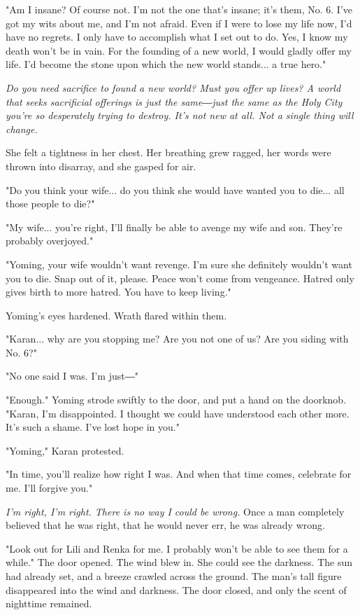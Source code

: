 "Am I insane? Of course not. I'm not the one that's insane; it's them,
No. 6. I've got my wits about me, and I'm not afraid. Even if I were to
lose my life now, I'd have no regrets. I only have to accomplish what I
set out to do. Yes, I know my death won't be in vain. For the founding
of a new world, I would gladly offer my life. I'd become the stone upon
which the new world stands... a true hero."

\emph{Do you need sacrifice to found a new world? Must you offer up lives? A
	world that seeks sacrificial offerings is just the same―just the same as
	the Holy City you're so desperately trying to destroy. It's not new at
	all. Not a single thing will change.}

She felt a tightness in her chest. Her breathing grew ragged, her words
were thrown into disarray, and she gasped for air.

"Do you think your wife... do you think she would have wanted you to
die... all those people to die?"

"My wife... you're right, I'll finally be able to avenge my wife and
son. They're probably overjoyed."

"Yoming, your wife wouldn't want revenge. I'm sure she definitely
wouldn't want you to die. Snap out of it, please. Peace won't come from
vengeance. Hatred only gives birth to more hatred. You have to keep
living."

Yoming's eyes hardened. Wrath flared within them.

"Karan... why are you stopping me? Are you not one of us? Are you siding
with No. 6?"

"No one said I was. I'm just―"

"Enough." Yoming strode swiftly to the door, and put a hand on the
doorknob. "Karan, I'm disappointed. I thought we could have understood
each other more. It's such a shame. I've lost hope in you."

"Yoming," Karan protested.

"In time, you'll realize how right I was. And when that time comes,
celebrate for me. I'll forgive you."

\emph{I'm right, I'm right. There is no way I could be wrong.} Once a man
completely believed that he was right, that he would never err, he was
already wrong.

"Look out for Lili and Renka for me. I probably won't be able to see
them for a while." The door opened. The wind blew in. She could see the
darkness. The sun had already set, and a breeze crawled across the
ground. The man's tall figure disappeared into the wind and darkness.
The door closed, and only the scent of nighttime remained.

